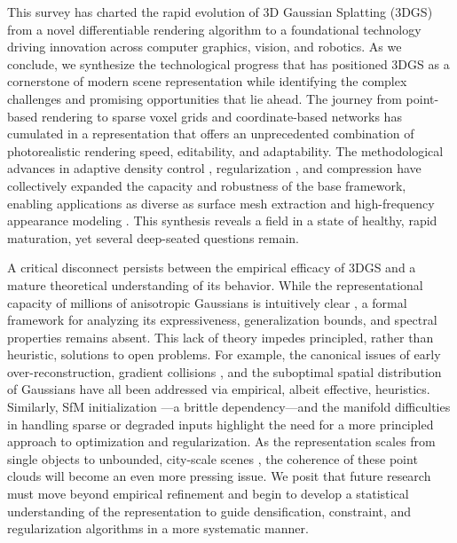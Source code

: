 \documentclass[11pt,a4paper]{article}
\begin{document}
This survey has charted the rapid evolution of 3D Gaussian Splatting (3DGS) from a novel differentiable rendering algorithm \cite{arxiv:2308.04079v1} to a foundational technology driving innovation across computer graphics, vision, and robotics. As we conclude, we synthesize the technological progress that has positioned 3DGS as a cornerstone of modern scene representation while identifying the complex challenges and promising opportunities that lie ahead. The journey from point-based rendering \cite{arxiv:2004.07484v3,arxiv:2103.01954v2,arxiv:2205.14330v4} to sparse voxel grids \cite{arxiv:2112.05131v1,arxiv:2103.14024v2} and coordinate-based networks \cite{arxiv:2205.10824v2} has cumulated in a representation that offers an unprecedented combination of photorealistic rendering speed, editability, and adaptability. The methodological advances in adaptive density control \cite{arxiv:2404.10484v1,arxiv:2403.14166v1}, regularization \cite{arxiv:2311.17910v1,arxiv:2403.08498v1,arxiv:2404.10772v1,arxiv:2403.08498v1}, and compression \cite{arxiv:2311.13681v2,arxiv:2407.11309v1,arxiv:2406.17074v1} have collectively expanded the capacity and robustness of the base framework, enabling applications as diverse as surface mesh extraction \cite{arxiv:2406.15643v1,arxiv:2404.00409v1,arxiv:2403.16964v1} and high-frequency appearance modeling \cite{arxiv:2311.17910v1,arxiv:2401.00834v1}. This synthesis reveals a field in a state of healthy, rapid maturation, yet several deep-seated questions remain.

A critical disconnect persists between the empirical efficacy of 3DGS and a mature theoretical understanding of its behavior. While the representational capacity of millions of anisotropic Gaussians is intuitively clear \cite{arxiv:2308.04079v1}, a formal framework for analyzing its expressiveness, generalization bounds, and spectral properties remains absent. This lack of theory impedes principled, rather than heuristic, solutions to open problems. For example, the canonical issues of early over-reconstruction, gradient collisions \cite{arxiv:2404.10484v1}, and the suboptimal spatial distribution of Gaussians \cite{arxiv:2403.14166v1} have all been addressed via empirical, albeit effective, heuristics. Similarly, SfM initialization \cite{arxiv:2311.17910v1}---a brittle dependency---and the manifold difficulties in handling sparse or degraded inputs \cite{arxiv:2311.17910v1,arxiv:2401.00834v1} highlight the need for a more principled approach to optimization and regularization. As the representation scales from single objects to unbounded, city-scale scenes \cite{arxiv:2406.12080v1,arxiv:2401.01339v1}, the coherence of these point clouds will become an even more pressing issue. We posit that future research must move beyond empirical refinement and begin to develop a statistical understanding of the representation to guide densification, constraint, and regularization algorithms in a more systematic manner.
\end{document}
